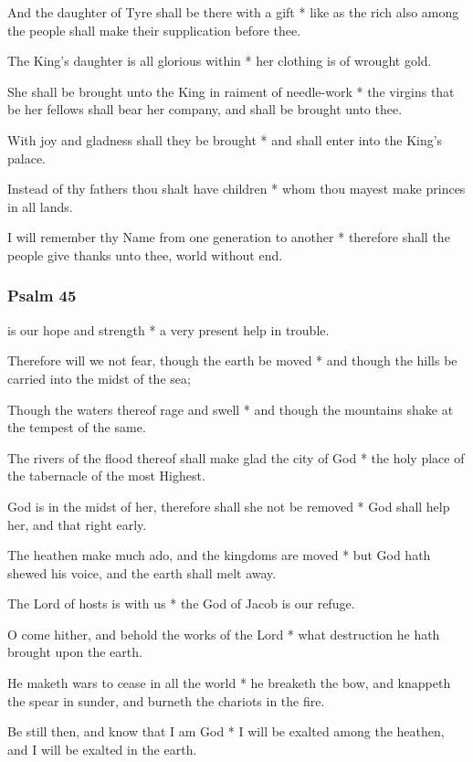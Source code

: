 And the daughter of Tyre shall be there with a gift * like as the rich also among the people shall make their supplication before thee.

The King's daughter is all glorious within * her clothing is of wrought gold.

She shall be brought unto the King in raiment of needle-work * the virgins that be her fellows shall bear her company, and shall be brought unto thee.

With joy and gladness shall they be brought * and shall enter into the King's palace.

Instead of thy fathers thou shalt have children * whom thou mayest make princes in all lands.

I will remember thy Name from one generation to another * therefore shall the people give thanks unto thee, world without end.

\subsubsection{Psalm 45}


 is our hope and strength * a very present help in trouble.

Therefore will we not fear, though the earth be moved * and though the hills be carried into the midst of the sea;

Though the waters thereof rage and swell * and though the mountains shake at the tempest of the same.

The rivers of the flood thereof shall make glad the city of God * the holy place of the tabernacle of the most Highest.

God is in the midst of her, therefore shall she not be removed * God shall help her, and that right early.

The heathen make much ado, and the kingdoms are moved * but God hath shewed his voice, and the earth shall melt away.

The Lord of hosts is with us * the God of Jacob is our refuge.

O come hither, and behold the works of the Lord * what destruction he hath brought upon the earth.

He maketh wars to cease in all the world * he breaketh the bow, and knappeth the spear in sunder, and burneth the chariots in the fire.

Be still then, and know that I am God * I will be exalted among the heathen, and I will be exalted in the earth.

